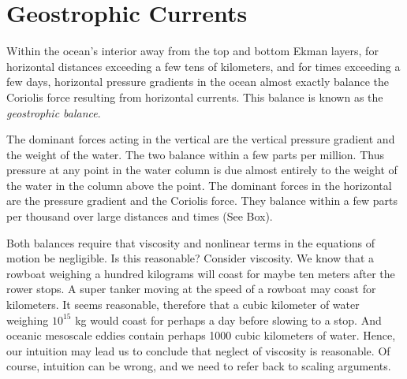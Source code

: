 \chapter{Geostrophic Currents}
Within the ocean's interior away from the top and bottom Ekman layers, for horizontal distances exceeding a few tens of kilometers, and for times
exceeding a few days, horizontal pressure gradients in the ocean almost exactly
balance the Coriolis force  resulting from horizontal currents. This balance is known
as the \textit{geostrophic balance}.

The dominant forces acting in the vertical are the vertical pressure gradient and
the weight of the water. The two balance within a few parts per million. Thus
pressure at any point in the water column is due almost entirely to the weight of
the water in the column above the point. The dominant forces in the horizontal
are the pressure gradient and the Coriolis force. They balance within a few parts
per thousand over large distances and times (See Box).

Both balances require that viscosity and nonlinear terms in the equations of
motion be negligible. Is this reasonable? Consider viscosity. We know that a
rowboat weighing a hundred kilograms will coast for maybe ten meters after the
rower stops. A super tanker moving at the speed of a rowboat may coast for
kilometers. It seems reasonable, therefore that a cubic kilometer of water
weighing $10^{15}$ kg would coast for perhaps a day before slowing to a stop. And
oceanic mesoscale eddies contain perhaps 1000 cubic kilometers of
water. Hence, our intuition may lead us to conclude that neglect of viscosity is reasonable.
Of course, intuition can be wrong, and we need to refer back to scaling
arguments.  

